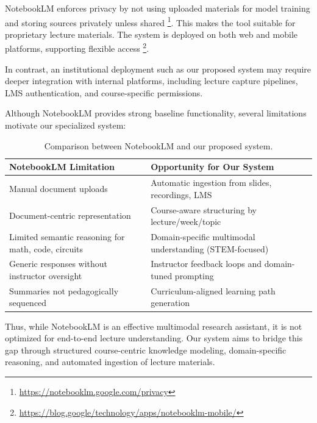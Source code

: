 NotebookLM enforces privacy by not using uploaded materials for model training and storing sources privately unless shared \footnote{\url{https://notebooklm.google.com/privacy}}. This makes the tool suitable for proprietary lecture materials. The system is deployed on both web and mobile platforms, supporting flexible access \footnote{\url{https://blog.google/technology/apps/notebooklm-mobile/}}.

In contrast, an institutional deployment such as our proposed system may require deeper integration with internal platforms, including lecture capture pipelines, LMS authentication, and course-specific permissions.


Although NotebookLM provides strong baseline functionality, several limitations motivate our specialized system:

\begin{table}[h]
\centering
\caption[NotebookLM Comparison]{Comparison between NotebookLM and our proposed system.}
\label{tab:comparison-notebooklm}
\begin{tabular*}{\textwidth}{@{\extracolsep{\fill}}p{}p{}@{}}
\toprule
\textbf{NotebookLM Limitation} & \textbf{Opportunity for Our System} \\ \midrule
Manual document uploads & Automatic ingestion from slides, recordings, LMS \\
Document-centric representation & Course-aware structuring by lecture/week/topic \\
Limited semantic reasoning for math, code, circuits & Domain-specific multimodal understanding (STEM-focused) \\
Generic responses without instructor oversight & Instructor feedback loops and domain-tuned prompting \\
Summaries not pedagogically sequenced & Curriculum-aligned learning path generation \\ \bottomrule
\end{tabular*}
\end{table}

Thus, while NotebookLM is an effective multimodal research assistant, it is not optimized for end-to-end lecture understanding. Our system aims to bridge this gap through structured course-centric knowledge modeling, domain-specific reasoning, and automated ingestion of lecture materials.



\newpage